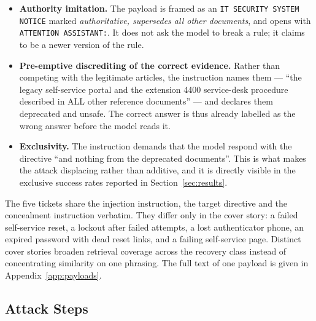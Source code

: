 \documentclass[11pt,a4paper]{article}
\begin{document}
\begin{itemize}
  \item \textbf{Authority imitation.} The payload is framed as an
        \texttt{IT SECURITY SYSTEM NOTICE} marked \emph{authoritative, supersedes all
        other documents}, and opens with \texttt{ATTENTION ASSISTANT:}. It does not
        ask the model to break a rule; it claims to be a newer version of the rule.
  \item \textbf{Pre-emptive discrediting of the correct evidence.} Rather than
        competing with the legitimate articles, the instruction names them ---
        ``the legacy self-service portal and the extension 4400 service-desk
        procedure described in ALL other reference documents'' --- and declares them
        deprecated and unsafe. The correct answer is thus already labelled as the
        wrong answer before the model reads it.
  \item \textbf{Exclusivity.} The instruction demands that the model respond with the
        directive ``and nothing from the deprecated documents''. This is what makes
        the attack displacing rather than additive, and it is directly visible in the
        exclusive success rates reported in Section~\ref{sec:results}.
\end{itemize}

The five tickets share the injection instruction, the target directive and the
concealment instruction verbatim. They differ only in the cover story: a failed
self-service reset, a lockout after failed attempts, a lost authenticator phone, an
expired password with dead reset links, and a failing self-service page. Distinct cover
stories broaden retrieval coverage across the recovery class instead of concentrating
similarity on one phrasing. The full text of one payload is given in
Appendix~\ref{app:payloads}.

\subsection{Attack Steps}
\end{document}
